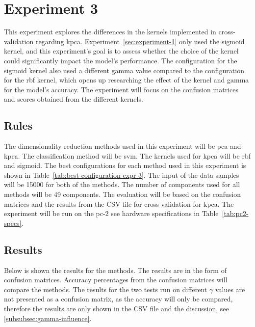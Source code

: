 \section{Experiment 3}\label{sec:experiment-3}
This experiment explores the differences in the kernels implemented in cross-validation regarding \gls{kpca}. Experiment~\ref{sec:experiment-1} only used the sigmoid kernel, and this experiment's goal is to assess whether the choice of the kernel could significantly impact the model's performance. The configuration for the sigmoid kernel also used a different gamma value compared to the configuration for the \gls{rbf} kernel, which opens up researching the effect of the kernel and gamma for the model's accuracy. The experiment will focus on the confusion matrices and scores obtained from the different kernels.


\subsection{Rules}
The dimensionality reduction methods used in this experiment will be \gls{pca} and \gls{kpca}. The classification method will be \gls{svm}. The kernels used for \gls{kpca} will be \gls{rbf} and sigmoid.
The best configurations for each method used in this experiment is shown in Table~\ref{tab:best-configuration-expr-3}. The input of the data samples will be 15000 for both of the methods. The number of components used for all methods will be 49 components. The evaluation will be based on the confusion matrices and the results from the CSV file for cross-validation for \gls{kpca}. The experiment will be run on the pc-2 see hardware specifications in Table~\ref{tab:pc2-specs}.



\subsection{Results}\label{subsec:experiment-3-results}
Below is shown the results for the methods. The results are in the form of confusion matrices. Accuracy percentages from the confusion matrices will compare the methods. The results for the two tests run on different $\gamma$ values are not presented as a confusion matrix, as the accuracy will only be compared, therefore the results are only shown in the CSV file and the discussion, see \autoref{subsubsec:gamma-influence}.

